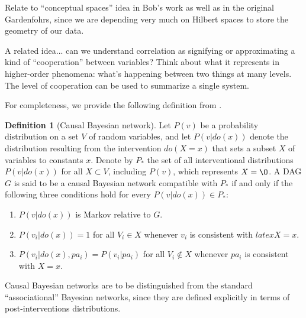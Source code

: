 \documentclass{article}
\theoremstyle{definition}
\newtheorem{definition}[theorem]{Definition}
\newcommand{\redout}[1]{{\color{red}#1}}
\begin{document}

\redout{Relate to ``conceptual spaces'' idea in Bob's work as well as in the original Gardenfohrs, since we are depending very much on Hilbert spaces to store the geometry of our data.}

\redout{A related idea... can we understand correlation as signifying or approximating a kind of ``cooperation'' between variables? Think about what it represents in higher-order phenomena: what's happening between two things at many levels. The level of cooperation can be used to summarize a single system.}

\redout{For completeness, we provide the following definition from \cite{pearl09}.

\begin{definition}[Causal Bayesian network] Let $P(v)$ be a probability distribution on a set $V$ of random variables, and let $P(v|do(x))$ denote the distribution resulting from the intervention $do(X = x)$ that sets a subset $X$ of variables to constants $x$. Denote by $P_\ast$ the set of all interventional distributions $P(v|do(x))$ for all $X \subset V$, including $P(v)$, which represents $X = \O$. A DAG $G$ is said to be a causal Bayesian network compatible with $P_\ast$ if and only if the following three conditions hold for every $P(v|do(x)) \in P_\ast$:
\begin{enumerate}
\item $P(v|do(x))$ is Markov relative to $G$.
\item $P(v_i|do(x)) = 1$ for all $V_i \in X$ whenever $v_i$ is consistent with $latex X = x$.
\item $P(v_i|do(x), pa_i) = P(v_i | pa_i)$ for all $V_i \notin X$ whenever $pa_i$ is consistent with $X =x$.
\end{enumerate}
Causal Bayesian networks are to be distinguished from the standard ``associational'' Bayesian networks, since they are defined explicitly in terms of post-interventions distributions.
\end{definition}
}


\end{document}

